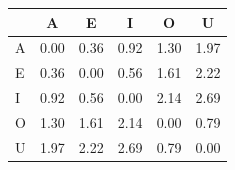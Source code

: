\begin{tabular}{lccccc}
\toprule
\rowcolor{col01}
 & A & E & I & O & U \\
\midrule
A & 0.00 & 0.36 & 0.92 & 1.30 & 1.97 \\
E & 0.36 & 0.00 & 0.56 & 1.61 & 2.22 \\
I & 0.92 & 0.56 & 0.00 & 2.14 & 2.69 \\
O & 1.30 & 1.61 & 2.14 & 0.00 & 0.79 \\
U & 1.97 & 2.22 & 2.69 & 0.79 & 0.00 \\
\bottomrule
\end{tabular}
